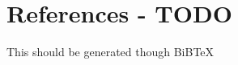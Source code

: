 \section{References - TODO}
This should be generated though BiBTeX

\begin{thebibliography}
	
\end{thebibliography}